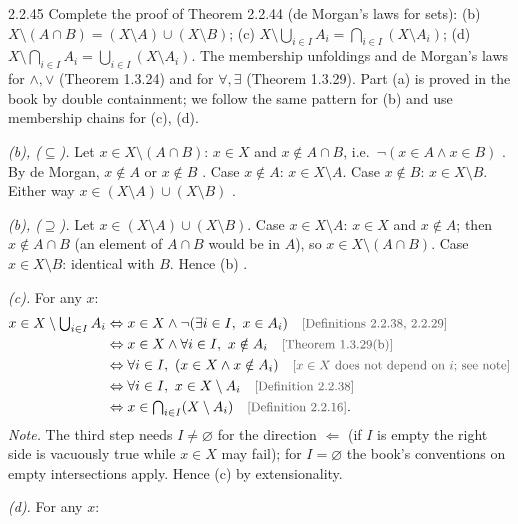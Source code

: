 \begin{bookex}[recommended]{2.2.45}
Complete the proof of Theorem 2.2.44 (de Morgan's laws for sets): (b) $X\setminus(A\cap B)=(X\setminus A)\cup(X\setminus B)$; (c) $X\setminus\bigcup_{i\in I}A_i=\bigcap_{i\in I}(X\setminus A_i)$; (d) $X\setminus\bigcap_{i\in I}A_i=\bigcup_{i\in I}(X\setminus A_i)$.
\solution
\given The membership unfoldings and de Morgan's laws for $\wedge,\vee$ (Theorem 1.3.24) and for $\forall,\exists$ (Theorem 1.3.29). Part (a) is proved in the book by double containment; we follow the same pattern for (b) and use membership chains for (c), (d).
\begin{steps}
\item \emph{(b), ($\subseteq$).} Let $x\in X\setminus(A\cap B)$: $x\in X$ and $x\notin A\cap B$, i.e.\ $\neg(x\in A\wedge x\in B)$ . By de Morgan, $x\notin A$ or $x\notin B$ . Case $x\notin A$: $x\in X\setminus A$. Case $x\notin B$: $x\in X\setminus B$. Either way $x\in(X\setminus A)\cup(X\setminus B)$ .
\item \emph{(b), ($\supseteq$).} Let $x\in(X\setminus A)\cup(X\setminus B)$. Case $x\in X\setminus A$: $x\in X$ and $x\notin A$; then $x\notin A\cap B$ (an element of $A\cap B$ would be in $A$), so $x\in X\setminus(A\cap B)$. Case $x\in X\setminus B$: identical with $B$. Hence (b) .
\item \emph{(c).} For any $x$:
\begin{align*}
x\in X\setminus\textstyle\bigcup_{i\in I}A_i&\Leftrightarrow x\in X\wedge\neg(\exists i\in I,\ x\in A_i)\why{Definitions 2.2.38, 2.2.29}\\
&\Leftrightarrow x\in X\wedge\forall i\in I,\ x\notin A_i\why{Theorem 1.3.29(b)}\\
&\Leftrightarrow\forall i\in I,\ (x\in X\wedge x\notin A_i)\why{$x\in X$ does not depend on $i$; see note}\\
&\Leftrightarrow\forall i\in I,\ x\in X\setminus A_i\why{Definition 2.2.38}\\
&\Leftrightarrow x\in\textstyle\bigcap_{i\in I}(X\setminus A_i)\why{Definition 2.2.16}.
\end{align*}
\emph{Note.} The third step needs $I\ne\varnothing$ for the direction $\Leftarrow$ (if $I$ is empty the right side is vacuously true while $x\in X$ may fail); for $I=\varnothing$ the book's conventions on empty intersections apply. Hence (c) by extensionality.
\item \emph{(d).} For any $x$:

\end{steps}
\end{bookex}
